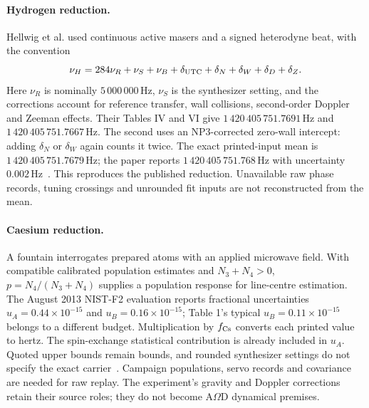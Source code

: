 \paragraph{Hydrogen reduction.}
Hellwig et al. used continuous active masers and a signed heterodyne beat,
with the convention
\begin{equation}
 \nu_H=284\nu_R+\nu_S+\nu_B+
 \delta_{\rm UTC}+\delta_N+\delta_W+\delta_D+\delta_Z.
 \label{eq:manual-m3-hydrogen-reduction}
\end{equation}
Here \(\nu_R\) is nominally \(5\,000\,000\,\mathrm{Hz}\), \(\nu_S\) is the
synthesizer setting, and the corrections account for reference transfer,
wall collisions, second-order Doppler and Zeeman effects.
Their Tables IV and VI give \(1\,420\,405\,751.7691\,\mathrm{Hz}\) and
\(1\,420\,405\,751.7667\,\mathrm{Hz}\).
The second uses an NP3-corrected zero-wall intercept: adding \(\delta_N\)
or \(\delta_W\) again counts it twice. The exact printed-input mean is
\(1\,420\,405\,751.7679\,\mathrm{Hz}\); the paper reports
\(1\,420\,405\,751.768\,\mathrm{Hz}\) with uncertainty
\(0.002\,\mathrm{Hz}\)~\cite{hellwig-hydrogen-1970}.
This reproduces the published reduction. Unavailable raw phase records,
tuning crossings and unrounded fit inputs are not reconstructed from the mean.

\paragraph{Caesium reduction.}
A fountain interrogates prepared atoms with an applied microwave field.
With compatible calibrated population estimates and \(N_3+N_4>0\),
\(p=N_4/(N_3+N_4)\) supplies a population response for line-centre estimation.
The August 2013 NIST-F2 evaluation reports fractional uncertainties
\(u_A=0.44\times10^{-15}\) and \(u_B=0.16\times10^{-15}\);
Table 1's typical \(u_B=0.11\times10^{-15}\) belongs to a different budget.
Multiplication by \(f_{\rm Cs}\) converts each printed value to hertz.
The spin-exchange statistical contribution is already included in \(u_A\).
Quoted upper bounds remain bounds, and rounded synthesizer settings do not
specify the exact carrier~\cite{heavner-nist-f2-2014}.
Campaign populations, servo records and covariance are needed for raw replay.
The experiment's gravity and Doppler corrections retain their source roles;
they do not become A\(\Omega\)D dynamical premises.

